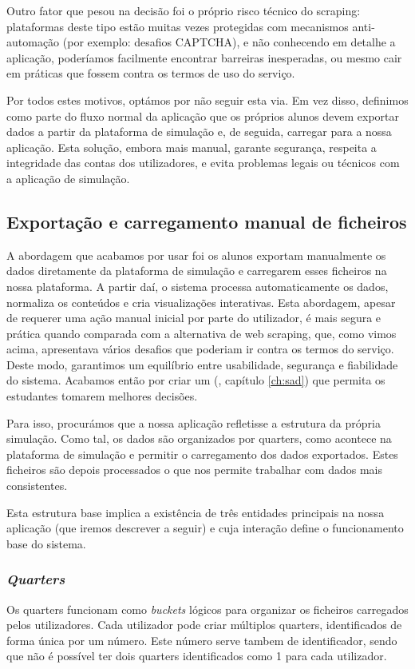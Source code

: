 Outro fator que pesou na decisão foi o próprio risco técnico do scraping: plataformas deste tipo estão muitas vezes protegidas com mecanismos anti-automação (por exemplo: desafios CAPTCHA), e não conhecendo em detalhe a aplicação, poderíamos facilmente encontrar barreiras inesperadas, ou mesmo cair em práticas que fossem contra os termos de uso do serviço.

Por todos estes motivos, optámos por não seguir esta via. Em vez disso, definimos como parte do fluxo normal da aplicação que os próprios alunos devem exportar dados a partir da plataforma de simulação e, de seguida, carregar para a nossa aplicação. Esta solução, embora mais manual, garante segurança, respeita a integridade das contas dos utilizadores, e evita problemas legais ou técnicos com a aplicação de simulação.

\subsection{Exportação e carregamento manual de ficheiros}

A abordagem que acabamos por usar foi os alunos exportam manualmente os dados diretamente da plataforma de simulação e carregarem esses ficheiros na nossa plataforma. A partir daí, o sistema processa automaticamente os dados, normaliza os conteúdos e cria visualizações interativas. Esta abordagem, apesar de requerer uma ação manual inicial por parte do utilizador, é mais segura e prática quando comparada com a alternativa de web scraping, que, como vimos acima, apresentava vários desafios que poderiam ir contra os termos do serviço. Deste modo, garantimos um equilíbrio entre usabilidade, segurança e fiabilidade do sistema. Acabamos então por criar um  (\cf, capítulo \ref{ch:sad}) que permita os estudantes tomarem melhores decisões.


Para isso, procurámos que a nossa aplicação refletisse a estrutura da própria simulação. Como tal, os dados são organizados por quarters, como acontece na plataforma de simulação e permitir o carregamento dos dados exportados. Estes ficheiros são depois processados o que nos permite trabalhar com dados mais consistentes. 

Esta estrutura base implica a existência de três entidades principais na nossa aplicação (que iremos descrever a seguir) e cuja interação define o funcionamento base do sistema.


\subsubsection{\textit{Quarters}}
Os quarters funcionam como \textit{buckets} lógicos para organizar os ficheiros carregados pelos utilizadores. Cada utilizador pode criar múltiplos quarters, identificados de forma única por um número. Este número serve tambem de identificador, sendo que não é possível ter dois quarters identificados como 1 para cada utilizador.

